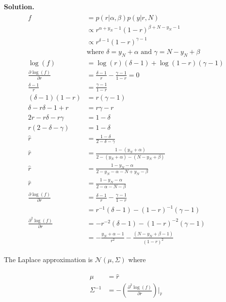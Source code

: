 \documentclass[10pt]{article}
\begin{document}
\begin{itemize}
{\bf Solution.}
\begin{eqnarray*}
\begin{aligned}
f &= p(r|\alpha, \beta) p(y|r,N) 
\\
&\propto r^{\alpha + y_N - 1}(1 -r)^{\beta + N - y_N - 1}
\\
&\propto r^{\delta - 1}(1 -r)^{\gamma - 1}
\\
&\text{where $\delta = y_N + \alpha$ and $\gamma = N - y_N + \beta$}
\\
\log(f) &= \log(r)(\delta - 1) + \log(1 - r)(\gamma - 1)
\\
\frac{\partial \log(f)}{\partial r} 
&= \frac{\delta - 1}{r} - \frac{\gamma - 1}{1 - r} = 0
\\
\frac{\delta - 1}{r} &= \frac{\gamma - 1}{1 - r}
\\
(\delta - 1)(1-r) &= r(\gamma - 1)
\\
\delta - r\delta - 1 + r &= r\gamma - r
\\
2r - r\delta - r\gamma &= 1 - \delta 
\\
r(2 - \delta - \gamma) &= 1 - \delta
\\
\hat{r} &= \frac{1 - \delta}{2 - \delta - \gamma} 
\\
\hat{r} &= \frac{1 - (y_N + \alpha)}{ 2 - (y_N + \alpha) - (N - y_N + \beta)}
\\
\hat{r} &= \frac{1 - y_N - \alpha}{ 2 - y_N - \alpha - N + y_N - \beta}
\\
\hat{r} &= \frac{1 - y_N - \alpha}{ 2 - \alpha - N - \beta}
\\
\frac{\partial \log(f)}{\partial r} &= \frac{\delta - 1}{r} - \frac{\gamma - 1}{1 - r}
\\
&= r^{-1}(\delta - 1) - (1 - r)^{-1}(\gamma - 1)
\\
\frac{\partial^2 \log(f)}{\partial r} 
&= - r^{-2}(\delta - 1) - (1 - r)^{-2}(\gamma - 1)\\
&= - \frac{y_N + \alpha - 1}{r^2} - \frac{(N - y_N + \beta - 1)}{(1-r)^2}
\end{aligned}
\end{eqnarray*}

The Laplace approximation is $\mathcal{N}(\mu, \Sigma)$ where

\begin{eqnarray*}
\begin{aligned}
\mu &= \hat{r}
\\
\Sigma^{-1} &= - \left( \frac{\partial^2 \log(f)}{\partial r} \right) \Big|_{\hat{r}}
\end{aligned}
\end{eqnarray*}



\end{itemize}
\end{document}
